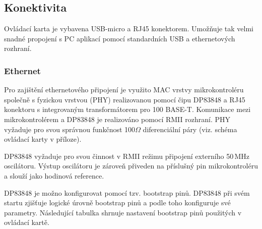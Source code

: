     \subsection{Konektivita}
    Ovládací karta je vybavena USB-micro a RJ45 konektorem. Umožňuje tak velmi snadné propojení s PC aplikací
    pomocí standardních USB a ethernetových rozhraní.

    \subsubsection{Ethernet}
    Pro zajištění ethernetového připojení je využito MAC
    vrstvy mikrokontroléru společně s fyzickou vrstvou (PHY)
    realizovanou pomocí čipu DP83848 a RJ45 konektoru s integrovaným transformátorem pro 100 BASE-T. Komunikace mezi
    mikrokontrolérem a DP83848 je realizováno pomocí RMII rozhraní. PHY vyžaduje pro svou správnou funkčnost
    100$\Omega$ diferenciální páry (viz. schéma ovládací karty v příloze).\par
    
    DP83848 vyžaduje pro svou činnost v RMII režimu připojení externího 50\,MHz oscilátoru.
    Výstup oscilátoru je zároveň přiveden na příslušný pin mikrokontroléru a slouží jako 
    hodinová reference.\par

    DP83848 je možno konfigurovat pomocí tzv. bootstrap pinů. DP83848 při svém startu zjišťuje
    logické úrovně bootstrap pinů a podle toho konfiguruje své parametry. Následující tabulka
    shrnuje nastavení bootstrap pinů použitých v ovládací kartě.

    \begin{table}[ht!]
        \caption{Nastavení bootstrap pinů DP83848}
        \label{RMII settings}
        \end{table}


